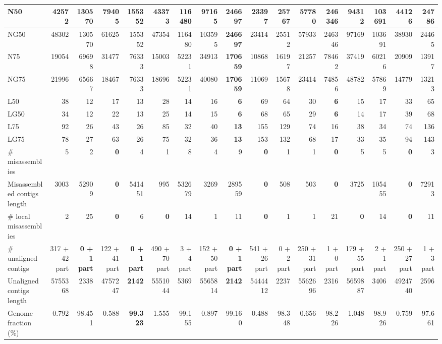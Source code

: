 \documentclass[12pt,a4paper]{article}
\begin{document}
\begin{table}[ht]
\begin{center}
\begin{tabular}{|l*{16}{|r}|}
N50 & 42572 & 130570 & 79405 & 155352 & 43373 & 116480 & 97165 & {\bf 246697} & 23397 & 25767 & 57780 & 246346 & 94312 & 103691 & 44126 & 24786 \\ \hline
NG50 & 48302 & 130570 & 61625 & 155352 & 47354 & 116480 & 103595 & {\bf 246697} & 23414 & 25512 & 57933 & 246346 & 97169 & 103691 & 38930 & 24465 \\ \hline
N75 & 19054 & 69698 & 31477 & 76333 & 15003 & 52231 & 34913 & {\bf 170659} & 10868 & 16197 & 21257 & 78462 & 37419 & 60216 & 20909 & 13917 \\ \hline
NG75 & 21996 & 65667 & 18467 & 76333 & 18696 & 52231 & 40080 & {\bf 170659} & 11069 & 15678 & 23414 & 74856 & 48782 & 57869 & 14779 & 13213 \\ \hline
L50 & 38 & 12 & 17 & 13 & 28 & 14 & 16 & {\bf 6} & 69 & 64 & 30 & {\bf 6} & 15 & 17 & 33 & 65 \\ \hline
LG50 & 34 & 12 & 22 & 13 & 25 & 14 & 15 & {\bf 6} & 68 & 65 & 29 & {\bf 6} & 14 & 17 & 39 & 68 \\ \hline
L75 & 92 & 26 & 43 & 26 & 85 & 32 & 40 & {\bf 13} & 155 & 129 & 74 & 16 & 38 & 34 & 74 & 136 \\ \hline
LG75 & 78 & 27 & 63 & 26 & 75 & 32 & 36 & {\bf 13} & 153 & 132 & 68 & 17 & 33 & 35 & 94 & 143 \\ \hline
\# misassemblies & 5 & 2 & {\bf 0} & 4 & 1 & 8 & 4 & 9 & {\bf 0} & 1 & 1 & {\bf 0} & 5 & 5 & {\bf 0} & 3 \\ \hline
Misassembled contigs length & 3003 & 52909 & {\bf 0} & 541451 & 995 & 532679 & 3269 & 289559 & {\bf 0} & 508 & 503 & {\bf 0} & 3725 & 105455 & {\bf 0} & 72913 \\ \hline
\# local misassemblies & 2 & 25 & {\bf 0} & 6 & {\bf 0} & 14 & 1 & 11 & {\bf 0} & 1 & 1 & 21 & {\bf 0} & 14 & {\bf 0} & 11 \\ \hline
\# unaligned contigs & 317 + 42 part & {\bf 0 + 1 part} & 122 + 41 part & {\bf 0 + 1 part} & 490 + 70 part & 3 + 4 part & 152 + 50 part & {\bf 0 + 1 part} & 541 + 26 part & 0 + 2 part & 250 + 31 part & 1 + 0 part & 179 + 55 part & 2 + 1 part & 250 + 27 part & 1 + 3 part \\ \hline
Unaligned contigs length & 5755368 & 2338 & 4757247 & {\bf 2142} & 5551044 & 5369 & 5565814 & {\bf 2142} & 5444412 & 2237 & 5562696 & 2316 & 5659887 & 3406 & 4924740 & 2596 \\ \hline
Genome fraction (\%) & 0.792 & 98.451 & 0.588 & {\bf 99.323} & 1.555 & 99.155 & 0.897 & 99.160 & 0.488 & 98.348 & 0.656 & 98.226 & 1.048 & 98.926 & 0.759 & 97.661 \\ \hline

\end{tabular}
\end{center}
\end{table}
\end{document}
